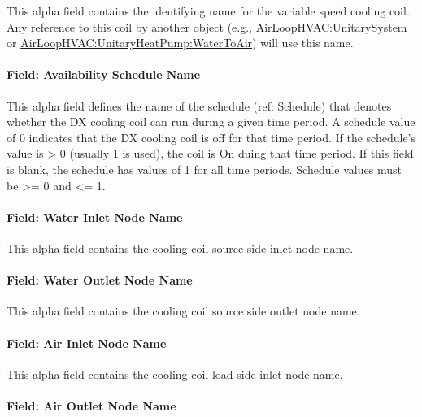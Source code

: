 This alpha field contains the identifying name for the variable speed cooling coil. Any reference to this coil by another object (e.g., \hyperref[airloophvacunitarysystem]{AirLoopHVAC:UnitarySystem} or \hyperref[airloophvacunitaryheatpumpwatertoair]{AirLoopHVAC:UnitaryHeatPump:WaterToAir}) will use this name.

\paragraph{Field: Availability Schedule Name}\label{field-availability-schedule-name-16-008}

This alpha field defines the name of the schedule (ref: Schedule) that denotes whether the DX cooling coil can run during a given time period. A schedule value of 0 indicates that the DX cooling coil is off for that time period. If the schedule's value is \textgreater{} 0 (usually 1 is used), the coil is On duing that time period. If this field is blank, the schedule has values of 1 for all time periods. Schedule values must be \textgreater{}= 0 and \textless{}= 1.


\paragraph{Field: Water Inlet Node Name}\label{field-water-inlet-node-name-7}

This alpha field contains the cooling coil source side inlet node name.

\paragraph{Field: Water Outlet Node Name}\label{field-water-outlet-node-name-7-000}

This alpha field contains the cooling coil source side outlet node name.

\paragraph{Field: Air Inlet Node Name}\label{field-air-inlet-node-name-18}

This alpha field contains the cooling coil load side inlet node name.

\paragraph{Field: Air Outlet Node Name}\label{field-air-outlet-node-name-18}

